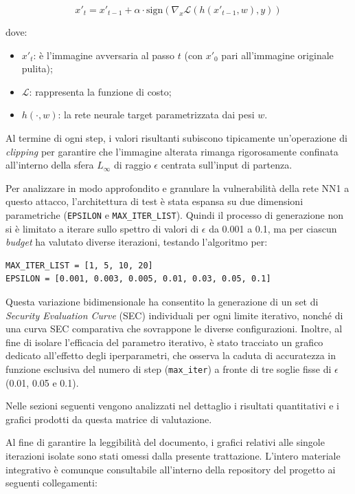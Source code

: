 \documentclass[a4paper, 12pt]{article}
\begin{document}
$$ x'_t = x'_{t-1} + \alpha \cdot \text{sign}(\nabla_x \mathcal{L}(h(x'_{t-1}, w), y)) $$

dove:
\begin{itemize}
    \item $x'_t$: è l'immagine avversaria al passo $t$ (con $x'_0$ pari all'immagine originale pulita);
    \item $\mathcal{L}$: rappresenta la funzione di costo;
    \item $h(\cdot, w)$: la rete neurale target parametrizzata dai pesi $w$.
\end{itemize}

Al termine di ogni step, i valori risultanti subiscono tipicamente un'operazione di \textit{clipping} per garantire che l'immagine alterata rimanga rigorosamente confinata all'interno della sfera $L_\infty$ di raggio $\epsilon$ centrata sull'input di partenza.

Per analizzare in modo approfondito e granulare la vulnerabilità della rete NN1 a questo attacco, l'architettura di test è stata espansa su due dimensioni parametriche (\texttt{EPSILON} e \texttt{MAX_ITER_LIST}). Quindi il processo di generazione non si è limitato a iterare sullo spettro di valori di $\epsilon$ da 0.001 a 0.1, ma per ciascun \textit{budget} ha valutato diverse iterazioni, testando l'algoritmo per: 
\begin{verbatim}
MAX_ITER_LIST = [1, 5, 10, 20]
EPSILON = [0.001, 0.003, 0.005, 0.01, 0.03, 0.05, 0.1]

\end{verbatim}

Questa variazione bidimensionale ha consentito la generazione di un set di \textit{Security Evaluation Curve} (SEC) individuali per ogni limite iterativo, nonché di una curva SEC comparativa che sovrappone le diverse configurazioni. Inoltre, al fine di isolare l'efficacia del parametro iterativo, è stato tracciato un grafico dedicato all'effetto degli iperparametri, che osserva la caduta di accuratezza in funzione esclusiva del numero di step (\texttt{max\_iter}) a fronte di tre soglie fisse di $\epsilon$ (0.01, 0.05 e 0.1). 

Nelle sezioni seguenti vengono analizzati nel dettaglio i risultati quantitativi e i grafici prodotti da questa matrice di valutazione.

Al fine di garantire la leggibilità del documento, i grafici relativi alle singole iterazioni isolate sono stati omessi dalla presente trattazione. L'intero materiale integrativo è comunque consultabile all'interno della repository del progetto ai seguenti collegamenti:
\end{document}
